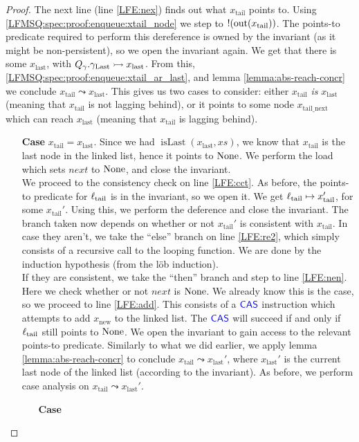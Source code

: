 \documentclass[a4paper, 10pt]{report}
\theoremstyle{definition}
\newcommand{\xsc}{xs}
\newcommand{\isLast}{\operatorname{isLast}}
\newcommand{\locN}[1]{\loc_{\mathrm{#1}}}
\newcommand{\loctail}{\locN{tail}}
\newcommand{\nOut}[1]{\operatorname{out}(#1)}
\newcommand{\node}{x}
\newcommand{\nodeN}[1]{\node_{\mathrm{#1}}}
\newcommand{\nodetail}{\nodeN{tail}}
\newcommand{\nodelast}{\nodeN{last}}
\newcommand{\nodenew}{\nodeN{new}}
\newcommand{\nodetailnext}{\nodeN{tail\_next}}
\newcommand{\Qg}{Q_\gname}
\newcommand{\glast}{\gname_{\mathrm{Last}}}
\newcommand{\reach}[2]{#1 \leadsto #2}
\newcommand{\ap}[2]{#1 \rightarrowtail #2}
\begin{document}
\begin{proof}
  The next line (line \ref{LFE:nex}) finds out what $\nodetail$ points to. Using \ref*{LFMSQ:spec:proof:enqueue:xtail_node} we step to $\deref (\nOut{\nodetail})$. The points-to predicate required to perform this dereference is owned by the invariant (as it might be non-persistent), so we open the invariant again. We get that there is some $\nodelast$, with $\ap{\Qg.\glast}{\nodelast}$. From this, \ref{LFMSQ:spec:proof:enqueue:xtail_ar_last}, and lemma \ref{lemma:abs-reach-concr} we conclude $\reach{\nodetail}{\nodelast}$. This gives us two cases to consider: either $\nodetail$ \textit{is} $\nodelast$ (meaning that $\nodetail$ is not lagging behind), or it points to some node $\nodetailnext$ which can reach $\nodelast$ (meaning that $\nodetail$ is lagging behind).
  \begin{itemize}
    \item[\textbf{Case}]
    $\nodetail = \nodelast$. Since we had $\isLast(\nodelast, \xsc)$, we know that $\nodetail$ is the last node in the linked list, hence it points to $\operatorname{None}$. We perform the load which sets $next$ to $\operatorname{None}$, and close the invariant.\\
    We proceed to the consistency check on line \ref{LFE:cct}. As before, the points-to predicate for $\loctail$ is in the invariant, so we open it. We get $\loctail \mapsto \nodetail'$, for some $\nodetail'$. Using this, we perform the deference and close the invariant. The branch taken now depends on whether or not $\nodetail'$ is consistent with $\nodetail$. In case they aren't, we take the ``else'' branch on line \ref{LFE:re2}, which simply consists of a recursive call to the looping function. We are done by the induction hypothesis (from the löb induction).\\
    If they are consistent, we take the ``then'' branch and step to line \ref{LFE:nen}. Here we check whether or not $next$ is $\operatorname{None}$. We already know this is the case, so we proceed to line \ref{LFE:add}. This consists of a $\textsf{\color{blue} CAS}$ instruction which attempts to add $\nodenew$ to the linked list. The $\textsf{\color{blue} CAS}$ will succeed if and only if $\loctail$ still points to $\operatorname{None}$. We open the invariant to gain access to the relevant points-to predicate. Similarly to what we did earlier, we apply lemma \ref{lemma:abs-reach-concr} to conclude $\reach{\nodetail}{\nodelast'}$, where $\nodelast'$ is the current last node of the linked list (according to the invariant). As before, we perform case analysis on $\reach{\nodetail}{\nodelast'}$.
    \begin{itemize}
      \item[\textbf{Case}]

\end{itemize}
\end{itemize}
\end{proof}
\end{document}
